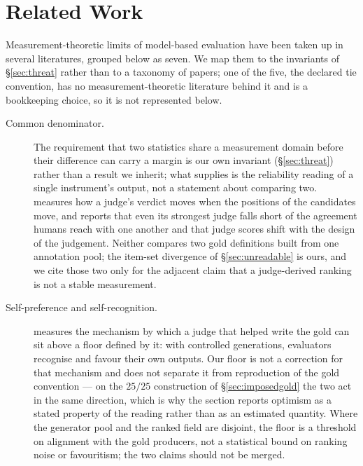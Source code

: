 \documentclass{article}
\begin{document}
\section{Related Work}
\label{sec:related}
Measurement-theoretic limits of model-based evaluation have been taken up in several literatures, grouped below as seven. We map them to the invariants of \S\ref{sec:threat} rather than to a taxonomy of papers; one of the five, the declared tie convention, has no measurement-theoretic literature behind it and is a bookkeeping choice, so it is not represented below.

\begin{description}
\item[Common denominator.] The requirement that two statistics share a measurement domain before their difference can carry a margin is our own invariant (\S\ref{sec:threat}) rather than a result we inherit; what \cite{cronbach1951} supplies is the reliability reading of a single instrument's output, not a statement about comparing two. \cite{shi2025positionbias} measures how a judge's verdict moves when the positions of the candidates move, and \cite{thakur2024judgingjudges} reports that even its strongest judge falls short of the agreement humans reach with one another and that judge scores shift with the design of the judgement. Neither compares two gold definitions built from one annotation pool; the item-set divergence of \S\ref{sec:unreadable} is ours, and we cite those two only for the adjacent claim that a judge-derived ranking is not a stable measurement.
\item[Self-preference and self-recognition.] \cite{panickssery2024selfpreference} measures the mechanism by which a judge that helped write the gold can sit above a floor defined by it: with controlled generations, evaluators recognise and favour their own outputs. Our floor is not a correction for that mechanism and does not separate it from reproduction of the gold convention --- on the $25/25$ construction of \S\ref{sec:imposedgold} the two act in the same direction, which is why the section reports optimism as a stated property of the reading rather than as an estimated quantity. Where the generator pool and the ranked field are disjoint, the floor is a threshold on alignment with the gold producers, not a statistical bound on ranking noise or favouritism; the two claims should not be merged.


\end{description}
\end{document}
